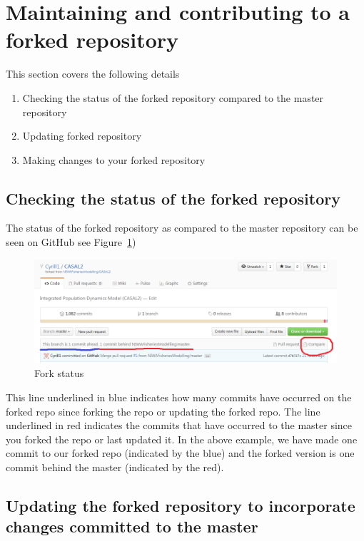\section{Maintaining and contributing to a forked repository\label{sec:maintain_repo}}

This section covers the following details

\begin{enumerate}
	\item Checking the status of the forked repository compared to the master repository
	\item Updating forked repository
	\item Making changes to your forked repository
\end{enumerate}

\subsection{Checking the status of the forked repository}

The status of the forked repository as compared to the master repository can be seen on GitHub see Figure~\ref{fig:fork_status})

\begin{figure}[!ht]
	\centering
	\includegraphics[scale=0.6]{Figures/fork_status.png}
	\caption{Fork status}\label{fig:fork_status}
\end{figure}

This line underlined in blue indicates how many commits have occurred on the forked repo since forking the repo or updating the forked repo. The line underlined in red indicates the commits that have occurred to the master since you forked the repo or last updated it. In the above example, we have made one commit to our forked repo (indicated by the blue) and the forked version is one commit behind the master (indicated by the red). 



\subsection{Updating the forked repository to incorporate changes committed to the master}

